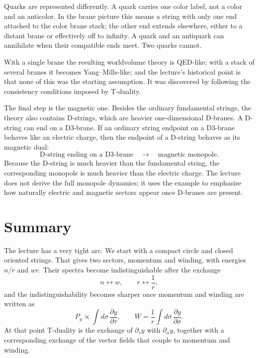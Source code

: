 Quarks are represented differently. A quark carries one color label, not a color and an anticolor. In the brane picture this means a string with only one end attached to the color brane stack; the other end extends elsewhere, either to a distant brane or effectively off to infinity. A quark and an antiquark can annihilate when their compatible ends meet. Two quarks cannot.

With a single brane the resulting worldvolume theory is QED-like; with a stack of several branes it becomes Yang--Mills-like; and the lecture's historical point is that none of this was the starting assumption. It was discovered by following the consistency conditions imposed by T-duality.

The final step is the magnetic one. Besides the ordinary fundamental strings, the theory also contains D-strings, which are heavier one-dimensional D-branes. A D-string can end on a D3-brane. If an ordinary string endpoint on a D3-brane behaves like an electric charge, then the endpoint of a D-string behaves as its magnetic dual:
\begin{equation}
\text{D-string ending on a D3-brane} \quad \longrightarrow \quad \text{magnetic monopole}.
\end{equation}
Because the D-string is much heavier than the fundamental string, the corresponding monopole is much heavier than the electric charge. The lecture does not derive the full monopole dynamics; it uses the example to emphasize how naturally electric and magnetic sectors appear once D-branes are present.

\section{Summary}

The lecture has a very tight arc. We start with a compact circle and closed oriented strings. That gives two sectors, momentum and winding, with energies \(n/r\) and \(wr\). Their spectra become indistinguishable after the exchange
\begin{equation}
n\leftrightarrow w, \qquad r\leftrightarrow \frac{1}{r},
\end{equation}
and the indistinguishability becomes sharper once momentum and winding are written as
\begin{equation}
P_y \propto \int d\sigma\,\frac{\partial y}{\partial \tau},
\qquad
W=\frac{1}{r}\int d\sigma\,\frac{\partial y}{\partial \sigma}.
\end{equation}
At that point T-duality is the exchange of \(\partial_\tau y\) with \(\partial_\sigma y\), together with a corresponding exchange of the vector fields that couple to momentum and winding.

